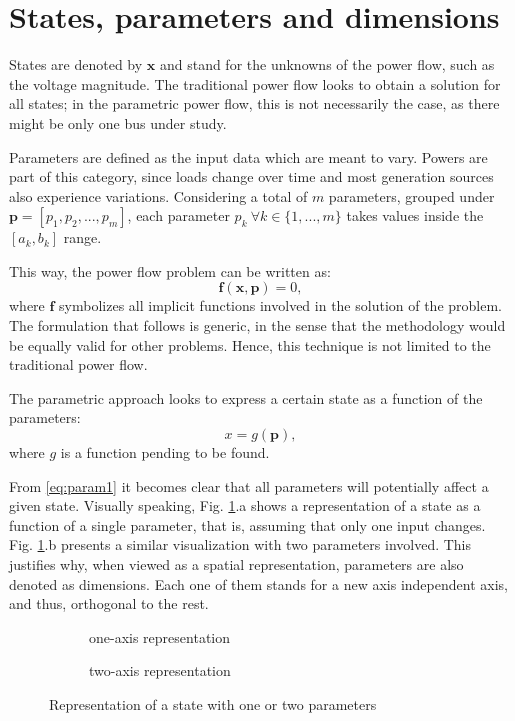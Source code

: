 \section{States, parameters and dimensions}
States are denoted by $\mathbf{x}$ and stand for the unknowns of the power flow, such as the voltage magnitude. The traditional power flow looks to obtain a solution for all states; in the parametric power flow, this is not necessarily the case, as there might be only one bus under study. 

Parameters are defined as the input data which are meant to vary. Powers are part of this category, since loads change over time and most generation sources also experience variations. Considering a total of $m$ parameters, grouped under $\mathbf{p} = [p_1, p_2, ..., p_m]$, each parameter $p_k \ \forall k \in \{1, ..., m\}$ takes values inside the $[a_k, b_k]$ range. 

This way, the power flow problem can be written as:
\begin{equation}
  \mathbf{f}(\mathbf{x}, \mathbf{p}) = 0,
  \label{eq:power1}
\end{equation}
where $\mathbf{f}$ symbolizes all implicit functions involved in the solution of the problem. The formulation that follows is generic, in the sense that the methodology would be equally valid for other problems. Hence, this technique is not limited to the traditional power flow. 

The parametric approach looks to express a certain state as a function of the parameters:
\begin{equation}
  x = g(\mathbf{p}), 
  \label{eq:param1}
\end{equation}
where $g$ is a function pending to be found. 

From \eqref{eq:param1} it becomes clear that all parameters will potentially affect a given state. Visually speaking, Fig. \ref{fig:1ax}.a shows a representation of a state as a function of a single parameter, that is, assuming that only one input changes. Fig. \ref{fig:1ax}.b presents a similar visualization with two parameters involved. This justifies why, when viewed as a spatial representation, parameters are also denoted as dimensions. Each one of them stands for a new axis independent axis, and thus, orthogonal to the rest. 

\begin{figure}[!htb]

  \begin{subfigure}{0.49\textwidth}
    \caption{one-axis representation}
  \end{subfigure}
  \hspace*{\fill}
  \begin{subfigure}{0.49\textwidth}
    \caption{two-axis representation}
  \end{subfigure}

  \caption{Representation of a state with one or two parameters}
  \label{fig:1ax}
\end{figure}


